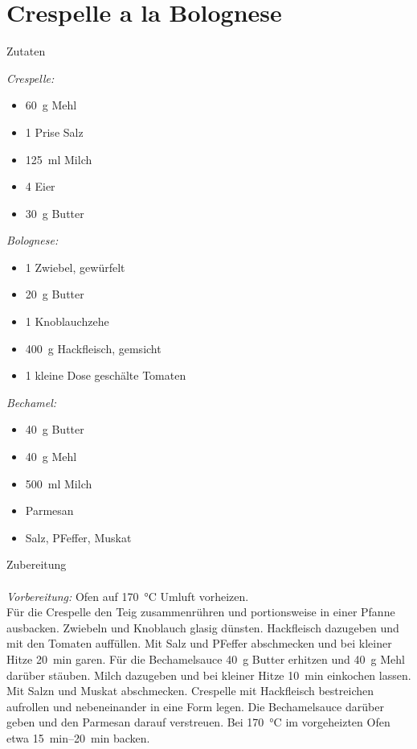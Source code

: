 \section*{Crespelle a la Bolognese}
\ihead{}\ohead{}
\cfoot{}
{\Large Zutaten}
\begin{multicols}{2}
\textit{Crespelle:}
\begin{itemize}
    \item \SI{60}{g} Mehl
    \item \num{1} Prise Salz
    \item \SI{125}{ml} Milch
    \item \num{4} Eier
    \item \SI{30}{g} Butter
\end{itemize}
\textit{Bolognese:}
\begin{itemize}
    \item \num{1} Zwiebel, gewürfelt
    \item \SI{20}{g} Butter
    \item \num{1} Knoblauchzehe
    \item \SI{400}{g} Hackfleisch, gemsicht
    \item \num{1} kleine Dose geschälte Tomaten
\end{itemize}
\textit{Bechamel:}
\begin{itemize}
    \item \SI{40}{g} Butter 
    \item \SI{40}{g} Mehl
    \item \SI{500}{ml} Milch
    \item Parmesan
    \item Salz, PFeffer, Muskat
\end{itemize}
\end{multicols}
\noindent
{\Large Zubereitung}\\
\\
\textit{Vorbereitung:} Ofen auf \SI{170}{\celsius} Umluft vorheizen.\\
Für die Crespelle den Teig zusammenrühren und portionsweise in einer Pfanne ausbacken.
Zwiebeln und Knoblauch glasig dünsten.
Hackfleisch dazugeben und mit den Tomaten auffüllen.
Mit Salz und PFeffer abschmecken und bei kleiner Hitze \SI{20}{min} garen.
Für die Bechamelsauce \SI{40}{g} Butter erhitzen und \SI{40}{g} Mehl darüber stäuben.
Milch dazugeben und bei kleiner Hitze \SI{10}{min} einkochen lassen. 
Mit Salzn und Muskat abschmecken.
Crespelle mit Hackfleisch bestreichen aufrollen und nebeneinander in eine Form legen. 
Die Bechamelsauce darüber geben und den Parmesan darauf verstreuen.
Bei \SI{170}{\celsius} im vorgeheizten Ofen etwa \SIrange{15}{20}{min} backen.